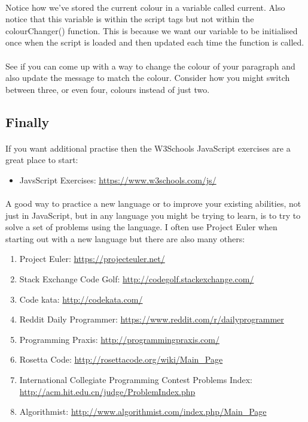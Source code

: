 \documentclass[10pt, a4paper, twosize]{article}
\begin{document}
\paragraph{} Notice how we've stored the current colour in a variable called current. Also notice that this variable is within the script tags but not within the colourChanger() function. This is because we want our variable to be initialised once when the script is loaded and then updated each time the function is called.

\paragraph{} See if you can come up with a way to change the colour of your paragraph and also update the message to match the colour. Consider how you might switch between three, or even four, colours instead of just two.


\subsection{Finally}
\paragraph{} If you want additional practise then the W3Schools JavaScript exercises are a great place to start:
\begin{itemize}
\item JavsScript Exercises: \url{https://www.w3schools.com/js/}
\end{itemize}

\paragraph{} A good way to practice a new language or to improve your existing abilities, not just in JavaScript, but in any language you might be trying to learn, is to try to solve a set of problems using the language. I often use Project Euler when starting out with a new language but there are also many others:

\begin{enumerate}
\item Project Euler: \url{https://projecteuler.net/}
\item Stack Exchange Code Golf: \url{http://codegolf.stackexchange.com/}
\item Code kata: \url{http://codekata.com/}
\item Reddit Daily Programmer: \url{https://www.reddit.com/r/dailyprogrammer}
\item Programming Praxis: \url{http://programmingpraxis.com/}
\item Rosetta Code: \url{http://rosettacode.org/wiki/Main_Page}
\item International Collegiate Programming Contest Problems Index: \url{http://acm.hit.edu.cn/judge/ProblemIndex.php}
\item Algorithmist: \url{http://www.algorithmist.com/index.php/Main_Page}
\end{enumerate}
\end{document}

